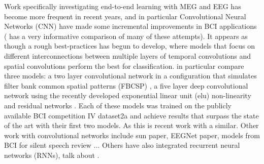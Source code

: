 \documentclass[utf8]{frontiersSCNS} %
\begin{document}
Work specifically investigating end-to-end learning with MEG and EEG has become more frequent in recent years, and in particular Convolutional Neural Networks (CNN) have made some incremental improvements in BCI applications (\cite{Schirrmeister2017} has a very informative comparison of many of these attempts). It appears as though a rough best-practices has begun to develop, where models that focus on different interconnections between multiple layers of temporal convolutions and spatial convolutions perform the best for classification. \cite{Schirrmeister2017} in particular compare three models: a two layer convolutional network in a configuration that simulates filter bank common spatial patterns (FBCSP) \cite{}, a five layer deep convolutional network using the recently developed exponential linear unit (elu) non-linearity \cite{} and residual networks \cite{He2015a}. Each of these models was trained on the publicly available BCI competition IV dataset2a and achieve results that surpass the state of the art with their first two models. As this is recent work with a similar. Other work with convolutional networks include sun paper, EEGNet paper, models from BCI for silent speech review ... Others have also integrated recurrent neural networks (RNNs), talk about \cite{Bashivan2016}.

\end{document}
